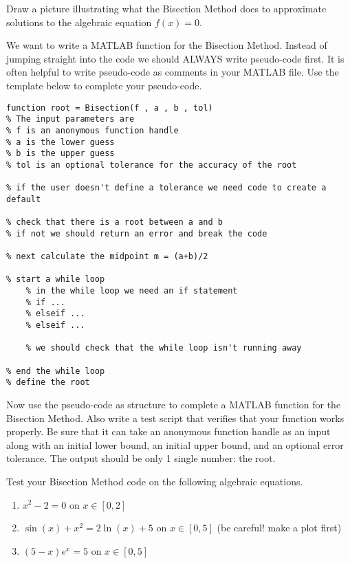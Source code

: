 \begin{problem}
    Draw a picture illustrating what the Bisection Method does to approximate solutions to
    the algebraic equation $f(x) = 0$.
\end{problem}


\begin{problem}
    We want to write a MATLAB function for the Bisection Method.  Instead of jumping
    straight into the code we should ALWAYS write pseudo-code first.  It is often helpful
    to write pseudo-code as comments in your MATLAB file.  Use the template below to
    complete your pseudo-code.
\begin{lstlisting}
function root = Bisection(f , a , b , tol)
% The input parameters are
% f is an anonymous function handle
% a is the lower guess
% b is the upper guess
% tol is an optional tolerance for the accuracy of the root

% if the user doesn't define a tolerance we need code to create a default

% check that there is a root between a and b
% if not we should return an error and break the code

% next calculate the midpoint m = (a+b)/2

% start a while loop
    % in the while loop we need an if statement
    % if ...
    % elseif ...
    % elseif ...

    % we should check that the while loop isn't running away

% end the while loop
% define the root
\end{lstlisting}
\end{problem}


\begin{problem}
    Now use the pseudo-code as structure to complete a MATLAB function for the Bisection
    Method.  Also write a test script that verifies that your function works properly. Be
    sure that it can take an anonymous function handle as an input along with an initial
    lower bound, an initial upper bound, and an optional error tolerance. The output
    should be only 1 single number: the root.\\
\end{problem}

\begin{problem}
    Test your Bisection Method code on the following algebraic equations.
    \begin{enumerate}
        \item $x^2 - 2 = 0$ on $x \in [0,2]$ 
        \item $\sin(x) + x^2 = 2\ln(x) + 5$ on $x \in [0,5]$ (be careful! make a plot
            first) 
        \item $(5-x)e^{x}=5$ on $x \in [0,5]$
    \end{enumerate}
\end{problem}


